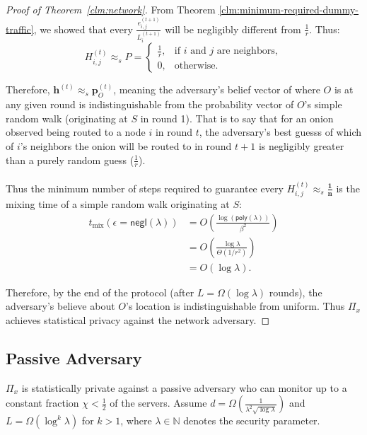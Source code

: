 \begin{proof} [Proof of Theorem~\ref{clm:network}]
From Theorem \ref{clm:minimum-required-dummy-traffic}, we showed that every $\frac{e^{(t + 1)}_{i,j}}{L^{(t + 1)}_i}$ will be negligibly different from $\frac{1}{r}$. Thus:
$$
H^{(t)}_{i,j} \approx_s P = 
\begin{cases}
    \frac{1}{r}, & \text{if $i$ and $j$ are neighbors},\\
    0, & \text{otherwise.}
\end{cases}
$$

Therefore, $\mathbf{h}^{(t)} \approx_s \mathbf{p}^{(t)}_O$, meaning the adversary's belief vector of where $O$ is at any given round is indistinguishable from the probability vector of $O$'s simple random walk (originating at $S$ in round 1). That is to say that for an onion observed being routed to a node $i$ in round $t$, the adversary's best guesss of which of $i$'s neighbors the onion will be routed to in round $t + 1$ is negligibly greater than a purely random guess ($\frac{1}{r}$).\\\\
Thus the minimum number of steps required to guarantee every $H^{(t)}_{i,j} \approx_s \mathbf{\frac{1}{n}}$ is the mixing time of a simple random walk originating at $S$:
\begin{align*}
    t_\text{mix}(\epsilon = \mathsf{negl}(\lambda)) &= O\left(\frac{\log(\mathsf{poly}(\lambda))}{\beta^2}\right)\\
    &= O\left(\frac{\log \lambda}{\Theta(1/r^2)}\right)\\
    &= O\left(\log \lambda\right).
\end{align*}

Therefore, by the end of the protocol (after $L = \Omega(\log \lambda)$ rounds), the adversary's believe about $O$'s location is indistinguishable from uniform. Thus $\Pi_x$ achieves statistical privacy against the network adversary.

\end{proof}

\clearpage

\subsection{Passive Adversary}

\begin{theorem} \label{clm:passive}
    $\Pi_x$ is statistically private against a passive adversary who can monitor up to a constant fraction $\chi < \frac{1}{2}$ of the servers. Assume $d = \Omega\left(\frac{1}{\lambda^2 \sqrt{\log \lambda}}\right)$ and $L = \Omega(\log^k \lambda)$ for $k > 1$, where $\lambda \in \mathbb{N}$ denotes the security parameter.\\
\end{theorem}

